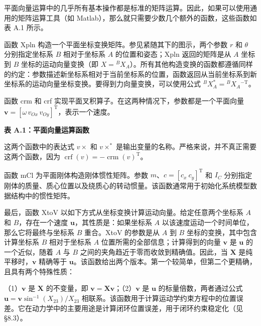 \documentclass[10pt,a4paper]{book}
\theoremstyle{thmstyle} %
\theoremstyle{defstyle} %
\theoremstyle{prostyle} %
\begin{document}
平面向量运算中的几乎所有基本操作都是标准的矩阵运算。因此，如果可以使用通用的矩阵运算工具（如 Matlab），那么就只需要少数几个额外的函数，这些函数如表 A.1 所示。



函数 Xpln 构造一个平面坐标变换矩阵。参见紧随其下的图示，两个参数 $r$ 和 $\theta$ 分别指定坐标系 $B$ 相对于坐标系 $A$ 的位置和姿态；Xpln 返回的矩阵是从 $A$ 坐标到 $B$ 坐标的运动向量变换（即 $X = {}^{B}X_{A}$）。所有其他构造变换的函数都遵循同样的约定：参数描述新坐标系相对于当前坐标系的位置，函数返回从当前坐标系到新坐标系的运动向量坐标变换。要得到力向量变换，可以使用公式 ${}^{B}X_{A}^{*} = {}^{B}X_{A}{}^{-\text{T}}$。



函数 crm 和 crf 实现平面叉积算子。在这两种情况下，参数都是一个平面向量 $\boldsymbol{v} = [\omega \, v_{Ox} \, v_{Oy}]^{\text{T}}$，表示一个速度。



\noindent\textbf{表 A.1：平面向量运算函数}





这两个函数中的表达式 $v\times$ 和 $v\times^{*}$ 是输出变量的名称。严格来说，并不真正需要这两个函数，因为 $\operatorname{crf}(v)=-\operatorname{crm}(v)^{\mathrm{T}}$。



函数 mCl 为平面刚体构造刚体惯性矩阵。参数 $m$、$c = [c_x \ c_y]^\text{T}$ 和 $I_C$ 分别指定刚体的质量、质心位置以及绕质心的转动惯量。该函数通常用于初始化系统模型数据结构中的惯性矩阵。



最后，函数 XtoV 以如下方式从坐标变换计算运动向量。给定任意两个坐标系 $A$ 和 $B$，存在一个速度 $\boldsymbol{u}$，其性质是：如果坐标系 $A$ 以该速度运动一个时间单位，那么它将最终与坐标系 $B$ 重合。XtoV 的参数是从 $A$ 到 $B$ 坐标的变换，其中包含计算坐标系 $B$ 相对于坐标系 $A$ 位置所需的全部信息；计算得到的向量 $\boldsymbol{v}$ 是 $\boldsymbol{u}$ 的一个近似，随着 $A$ 与 $B$ 之间的夹角趋近于零而收敛到精确值。因此，当 $\boldsymbol{X}$ 是纯平移时，$\boldsymbol{v}$ 精确等于 $\boldsymbol{u}$。该函数给出两个版本。第一个较简单，但第二个更精确，且具有两个特殊性质：



（1）$\boldsymbol{v}$ 是 $\boldsymbol{X}$ 的不变量，即 $\boldsymbol{v}=\boldsymbol{X}\boldsymbol{v}$；（2）$\boldsymbol{v}$ 是 $\boldsymbol{u}$ 的标量倍数，两者通过公式 $\boldsymbol{u}=\boldsymbol{v}\sin^{-1}(X_{23})/X_{23}$ 相联系。该函数用于计算运动学约束方程中的位置误差。它在动力学中的主要用途是计算闭环位置误差，用于闭环约束稳定化（见 §8.3）。
\end{document}

